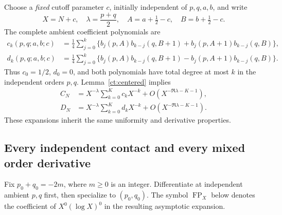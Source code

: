 \documentclass[11pt,letterpaper]{article}
\numberwithin{equation}{section}
\theoremstyle{definition}
\theoremstyle{remark}
\begin{document}
Choose a \emph{fixed} cutoff parameter $c$, initially independent of
$p,q,a,b$, and write
\begin{equation}\label{ct:fixed-cutoff}
 X=N+c,\quad \lambda=\frac{p+q}{2},\quad
 A=a+\tfrac12-c,\quad B=b+\tfrac12-c.
\end{equation}
The complete ambient coefficient polynomials are
\begin{align}
 c_k(p,q;a,b;c)
 &=\frac14\sum_{j=0}^k\bigl\{
 b_j(p,A)b_{k-j}(q,B+1)+b_j(p,A+1)b_{k-j}(q,B)\bigr\},
                         \label{ct:ck}\\
 d_k(p,q;a,b;c)
 &=\frac14\sum_{j=0}^k\bigl\{
 b_j(p,A)b_{k-j}(q,B+1)-b_j(p,A+1)b_{k-j}(q,B)\bigr\}.
                         \label{ct:dk}
\end{align}
Thus $c_0=1/2$, $d_0=0$, and both polynomials have total degree at most
$k$ in the independent orders $p,q$. Lemma~\ref{ct:centered} implies
\begin{align}
 C_N&=X^{-\lambda}\sum_{k=0}^Kc_kX^{-k}
          +O(X^{-\Re\lambda-K-1}),\label{ct:Cexp}\\
 D_N&=X^{-\lambda}\sum_{k=0}^Kd_kX^{-k}
          +O(X^{-\Re\lambda-K-1}).\label{ct:Dexp}
\end{align}
These expansions inherit the same uniformity and derivative properties.

\subsection{Every independent contact and every mixed order derivative}

Fix $p_0+q_0=-2m$, where $m\ge0$ is an integer. Differentiate at independent
ambient $p,q$ first, then specialize to $(p_0,q_0)$. The symbol
$\operatorname{FP}_X$ below denotes the coefficient of
$X^0(\log X)^0$ in the resulting asymptotic expansion.
\end{document}
